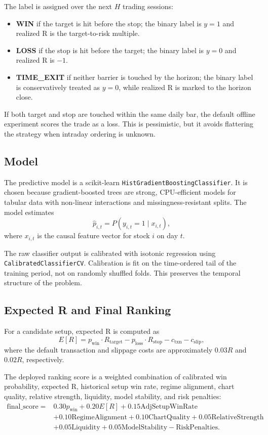 \documentclass[11pt]{article}
\begin{document}
The label is assigned over the next $H$ trading sessions:
\begin{itemize}[leftmargin=*]
    \item \textbf{WIN} if the target is hit before the stop; the binary label is
    $y=1$ and realized R is the target-to-risk multiple.
    \item \textbf{LOSS} if the stop is hit before the target; the binary label is
    $y=0$ and realized R is $-1$.
    \item \textbf{TIME\_EXIT} if neither barrier is touched by the horizon; the
    binary label is conservatively treated as $y=0$, while realized R is marked
    to the horizon close.
\end{itemize}

If both target and stop are touched within the same daily bar, the default
offline experiment scores the trade as a loss. This is pessimistic, but it
avoids flattering the strategy when intraday ordering is unknown.

\subsection{Model}

The predictive model is a scikit-learn
\texttt{HistGradientBoostingClassifier}. It is chosen because gradient-boosted
trees are strong, CPU-efficient models for tabular data with non-linear
interactions and missingness-resistant splits. The model estimates
\[
    \hat{p}_{i,t} = P(y_{i,t}=1 \mid x_{i,t}),
\]
where $x_{i,t}$ is the causal feature vector for stock $i$ on day $t$.

The raw classifier output is calibrated with isotonic regression using
\texttt{CalibratedClassifierCV}. Calibration is fit on the time-ordered tail of
the training period, not on randomly shuffled folds. This preserves the temporal
structure of the problem.

\subsection{Expected R and Final Ranking}

For a candidate setup, expected R is computed as
\[
    E[R] =
    p_{\mathrm{win}} \cdot R_{\mathrm{target}}
    -
    p_{\mathrm{loss}} \cdot R_{\mathrm{stop}}
    -
    c_{\mathrm{txn}}
    -
    c_{\mathrm{slip}},
\]
where the default transaction and slippage costs are approximately
$0.03R$ and $0.02R$, respectively.

The deployed ranking score is a weighted combination of calibrated win
probability, expected R, historical setup win rate, regime alignment, chart
quality, relative strength, liquidity, model stability, and risk penalties:
\[
\begin{aligned}
\mathrm{final\_score} ={}&
0.30p_{\mathrm{win}}
+ 0.20E[R]
+ 0.15\mathrm{AdjSetupWinRate} \\
&+ 0.10\mathrm{RegimeAlignment}
+ 0.10\mathrm{ChartQuality}
+ 0.05\mathrm{RelativeStrength} \\
&+ 0.05\mathrm{Liquidity}
+ 0.05\mathrm{ModelStability}
- \mathrm{RiskPenalties}.
\end{aligned}
\]
\end{document}
